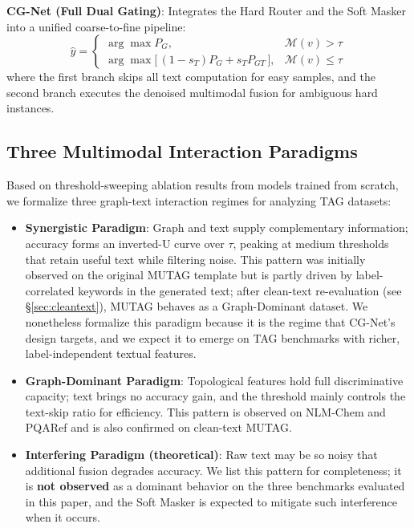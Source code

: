 \documentclass[preprint,12pt,authoryear]{elsarticle}
\begin{document}
\noindent\textbf{CG-Net (Full Dual Gating)}: Integrates the Hard Router and the Soft Masker into a unified coarse-to-fine pipeline:
\begin{equation}
\label{eq:ours}
\hat{y} =
\begin{cases}
\arg\max P_G, & \mathcal{M}(v) > \tau \\[4pt]
\arg\max\big[\,(1-s_T)P_G + s_T P_{GT}\,\big], & \mathcal{M}(v) \le \tau
\end{cases}
\end{equation}
\noindent where the first branch skips all text computation for easy samples, and the second branch executes the denoised multimodal fusion for ambiguous hard instances.

\subsection{Three Multimodal Interaction Paradigms}
\label{sec:paradigms}
Based on threshold-sweeping ablation results from models trained from scratch, we formalize three graph-text interaction regimes for analyzing TAG datasets:
\begin{itemize}
    \item \textbf{Synergistic Paradigm}: Graph and text supply complementary information; accuracy forms an inverted-U curve over $\tau$, peaking at medium thresholds that retain useful text while filtering noise. This pattern was initially observed on the original MUTAG template but is partly driven by label-correlated keywords in the generated text; after clean-text re-evaluation (see \S\ref{sec:cleantext}), MUTAG behaves as a Graph-Dominant dataset. We nonetheless formalize this paradigm because it is the regime that CG-Net's design targets, and we expect it to emerge on TAG benchmarks with richer, label-independent textual features.
    \item \textbf{Graph-Dominant Paradigm}: Topological features hold full discriminative capacity; text brings no accuracy gain, and the threshold mainly controls the text-skip ratio for efficiency. This pattern is observed on NLM-Chem and PQARef and is also confirmed on clean-text MUTAG.
    \item \textbf{Interfering Paradigm (theoretical)}: Raw text may be so noisy that additional fusion degrades accuracy. We list this pattern for completeness; it is \textbf{not observed} as a dominant behavior on the three benchmarks evaluated in this paper, and the Soft Masker is expected to mitigate such interference when it occurs.
\end{itemize}
\end{document}

